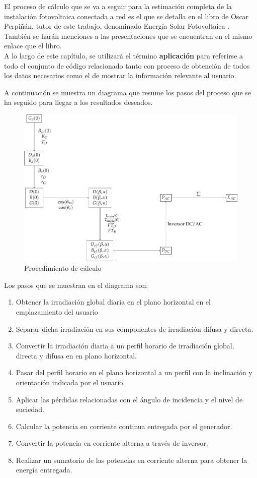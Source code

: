 El proceso de cálculo que se va a seguir para la estimación completa de la instalación fotovoltaica conectada a red es el que se detalla en el libro de Oscar Perpiñán, tutor de este trabajo, denominado Energía Solar Fotovoltaica \cite{esf_book}. También se harán menciones a las presentaciones que se encuentran en el mismo enlace que el libro.\\

A lo largo de este capítulo, se utilizará el término \textbf{aplicación} para referirse a todo el conjunto de código relacionado tanto con proceso de obtención de todos los datos necesarios como el de mostrar la información relevante al usuario.

A continuación se muestra un diagrama que resume los pasos del proceso que se ha seguido para llegar a los resultados deseados.

\begin{figure}[ht]
\includegraphics[scale=0.8]{diag_procedimiento_calculo}
\centering
\caption{Procedimiento de cálculo}
\label{fig:diag_procedimiento_calculo}
\end{figure}

Los pasos que se muestran en el diagrama son:
\begin{enumerate}
	\item Obtener la irradiación global diaria en el plano horizontal en el emplazamiento del usuario
	\item Separar dicha irradiación  en sus componentes de irradiación difusa y directa.
	\item Convertir la irradiación diaria a un perfil horario de irradiación global, directa y difusa en en plano horizontal.
	\item Pasar del perfil horario en el plano horizontal a un perfil con la inclinación y orientación indicada por el usuario.
	\item Aplicar las pérdidas relacionadas con el ángulo de incidencia y el nivel de suciedad.
	\item Calcular la potencia en corriente continua entregada por el generador.
	\item Convertir la potencia en corriente alterna a través de inversor.
	\item Realizar un sumatorio de las potencias en corriente alterna para obtener la energía entregada.
\end{enumerate}

